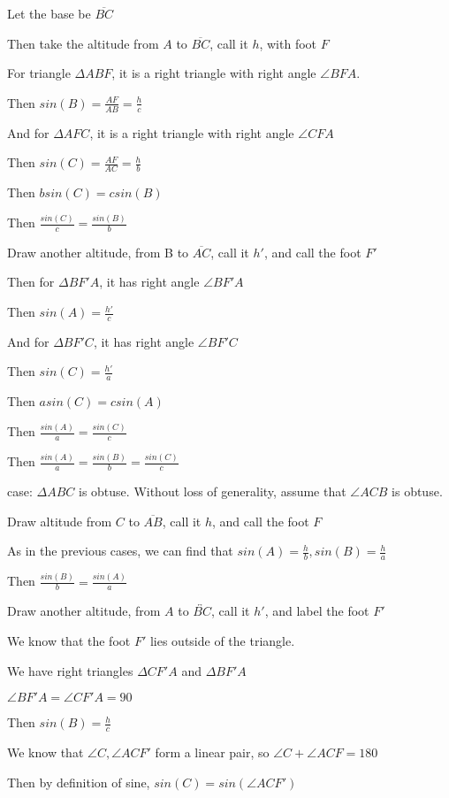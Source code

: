 \documentclass[11pt]{article}
\newcommand{\lines}[1]{\overleftrightarrow{#1}}
\newcommand{\segment}[1]{\overline{#1}}
\begin{document}
\begin{itemize}
	Let the base be $\segment{BC}$

	Then take the altitude from $A$ to $\segment{BC}$, call it $h$, with foot $F$

	For triangle $\Delta ABF$, it is a right triangle with right angle $\angle BFA$.

	Then $sin(B) = \frac{AF}{AB} = \frac{h}{c}$

	And for $\Delta AFC$, it is a right triangle with right angle $\angle CFA$

	Then $sin(C) = \frac{AF}{AC} = \frac{h}{b}$

	Then $bsin(C) = csin(B)$

	Then $\frac{sin(C)}{c} = \frac{sin(B)}{b}$

	Draw another altitude, from B to $\segment{AC}$, call it $h'$, and call the foot $F'$

	Then for $\Delta BF'A$, it has right angle $\angle BF'A$

	Then $sin(A) = \frac{h'}{c}$

	And for $\Delta BF'C$, it has right angle $\angle BF'C$

	Then $sin(C) = \frac{h'}{a}$

	Then $asin(C) = csin(A)$

	Then $\frac{sin(A)}{a} = \frac{sin(C)}{c}$

	Then $\frac{sin(A)}{a} = \frac{sin(B)}{b} = \frac{sin(C)}{c}$

	case: $\Delta ABC$ is obtuse. Without loss of generality, assume that $\angle ACB$ is obtuse.

	Draw altitude from $C$ to $\segment{AB}$, call it $h$, and call the foot $F$

	As in the previous cases, we can find that $sin(A) = \frac{h}{b}, sin(B) = \frac{h}{a}$

	Then $\frac{sin(B)}{b} = \frac{sin(A)}{a}$

	Draw another altitude, from $A$ to $\lines{BC}$, call it $h'$, and label the foot $F'$

	We know that the foot $F'$ lies outside of the triangle. 

	We have right triangles $\Delta CF'A$ and $\Delta BF'A$

	$\angle BF'A = \angle CF'A = 90$

	Then $sin(B) = \frac{h}{c}$

	We know that $\angle C, \angle ACF'$ form a linear pair, so $\angle C + \angle ACF
	 = 180$

	Then by definition of sine, $sin(C) = sin(\angle ACF')$


\end{itemize}
\end{document}
